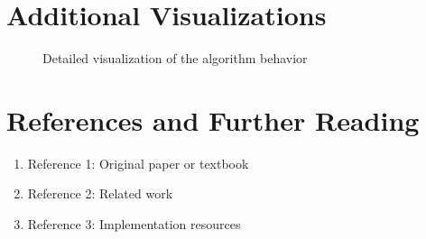 \documentclass[12pt]{article}
\theoremstyle{definition}
\begin{document}
\section{Additional Visualizations}

\begin{figure}[h]
\centering
\caption{Detailed visualization of the algorithm behavior}
\label{fig:visualization}
\end{figure}

\section{References and Further Reading}

\begin{enumerate}
    \item Reference 1: Original paper or textbook
    \item Reference 2: Related work
    \item Reference 3: Implementation resources
\end{enumerate}
\end{document}
